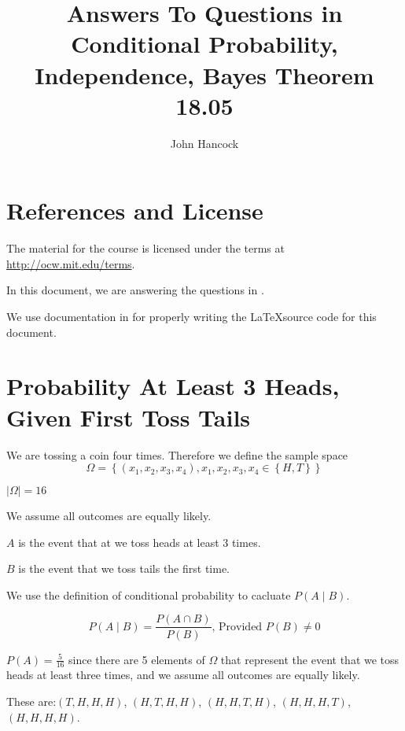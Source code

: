 \documentclass[a4paper,11pt]{article}
\author{John Hancock}
\title{Answers To Questions in Conditional Probability, Independence, 
Bayes Theorem 18.05}
\begin{document}
\maketitle
\tableofcontents
\section{References and License}
The material for the course is licensed under the terms at 
\url{http://ocw.mit.edu/terms}.

In this document, we are answering the questions in \cite{slides3}.

We use documentation in \cite{texInsertText} for properly writing the
\LaTeX source code for this document.
 
\label{prob1}
\section{Probability At Least 3 Heads, Given First Toss Tails}

We are tossing a coin four times. Therefore we define the sample space
\begin{equation}
  \Omega = \left\{ \left( x_{1}, x_{2}, x_{3}, x_{4} \right), 
    x_{1}, x_{2}, x_{3}, x_{4} \in \left\{H, T \right\} \right\}
\end{equation}

$ \left| \Omega \right| = 16$

We assume all outcomes are equally likely.

$A$ is the event that at we toss heads at least 3 times.

$B$ is the event that we toss tails the first time.


We use the definition of conditional probability to cacluate
$P \left( A \mid B \right)$.

\begin{equation} \label{defCondProb}
P \left( A \mid B \right) = \frac{ P \left( A \cap B \right) } 
  { P \left( B \right) } \text{, Provided  } P \left( B \right) \neq 0
\end{equation}

$P \left(A \right) = \frac{5}{16}$ since there are 5 elements of $\Omega$
that represent the event that we toss heads at least three times, and
we assume all outcomes are equally likely.

These are:$\left(T,H,H,H \right)$, $\left(H,T,H,H \right)$, 
$\left(H,H,T,H \right)$, $\left(H,H,H,T \right)$, 
$\left(H,H,H,H \right)$.
\end{document}
